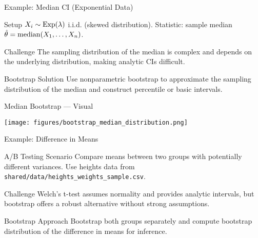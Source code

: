 \begin{frame}{Example: Median CI (Exponential Data)}
  \begin{block}{Setup}
    $X_i \sim \text{Exp}(\lambda)$ i.i.d. (skewed distribution).
    Statistic: sample median $\hat{\theta} = \operatorname{median}(X_1, \dots, X_n)$.
  \end{block}

  \begin{block}{Challenge}
    The sampling distribution of the median is complex and depends
    on the underlying distribution, making analytic CIs difficult.
  \end{block}

  \begin{block}{Bootstrap Solution}
    Use nonparametric bootstrap to approximate the sampling distribution
    of the median and construct percentile or basic intervals.
  \end{block}
\end{frame}

\begin{frame}{Median Bootstrap --- Visual}
  \begin{center}
    \texttt{[image: figures/bootstrap\_median\_distribution.png]}
  \end{center}
\end{frame}

\begin{frame}{Example: Difference in Means}
  \begin{block}{A/B Testing Scenario}
    Compare means between two groups with potentially different variances.
    Use heights data from \texttt{shared/data/heights\_weights\_sample.csv}.
  \end{block}

  \begin{block}{Challenge}
    Welch's t-test assumes normality and provides analytic intervals,
    but bootstrap offers a robust alternative without strong assumptions.
  \end{block}

  \begin{block}{Bootstrap Approach}
    Bootstrap both groups separately and compute bootstrap distribution
    of the difference in means for inference.
  \end{block}
\end{frame}


